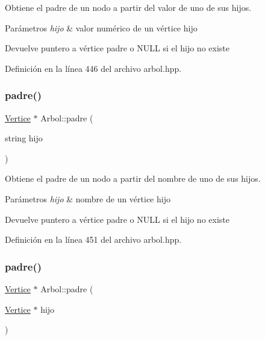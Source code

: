 Obtiene el padre de un nodo a partir del valor de uno de sus hijos. 


\begin{DoxyParams}{Parámetros}
{\em hijo} & valor numérico de un vértice hijo \\
\hline
\end{DoxyParams}
\begin{DoxyReturn}{Devuelve}
puntero a vértice padre o N\+U\+LL si el hijo no existe 
\end{DoxyReturn}


Definición en la línea 446 del archivo arbol.\+hpp.

\mbox{\label{classArbol_a53527e7a8999ceda0b8a0fa25a3f357c}} 
\subsubsection{\texorpdfstring{padre()}{padre()}\hspace{0.1cm}{\footnotesize\ttfamily [2/3]}}
{\footnotesize\ttfamily \hyperlink{classVertice}{Vertice} $\ast$ Arbol\+::padre (\begin{DoxyParamCaption}\item[{string}]{hijo }\end{DoxyParamCaption})}



Obtiene el padre de un nodo a partir del nombre de uno de sus hijos. 


\begin{DoxyParams}{Parámetros}
{\em hijo} & nombre de un vértice hijo \\
\hline
\end{DoxyParams}
\begin{DoxyReturn}{Devuelve}
puntero a vértice padre o N\+U\+LL si el hijo no existe 
\end{DoxyReturn}


Definición en la línea 451 del archivo arbol.\+hpp.

\mbox{\label{classArbol_a3395234bc7b7a91d2880e10367039284}} 
\subsubsection{\texorpdfstring{padre()}{padre()}\hspace{0.1cm}{\footnotesize\ttfamily [3/3]}}
{\footnotesize\ttfamily \hyperlink{classVertice}{Vertice} $\ast$ Arbol\+::padre (\begin{DoxyParamCaption}\item[{\hyperlink{classVertice}{Vertice} $\ast$}]{hijo }\end{DoxyParamCaption})}



